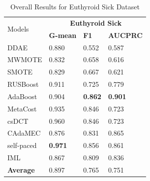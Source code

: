 \begin{table}[h]
    \centering
    \begin{tabular}{|p{}<{\centering}|p{}<{\centering}|p{}<{\centering}|p{}<{\centering}|}
    \hline
    \multirow{2}{*}{Models} & \multicolumn{3}{c|}{\textbf{Euthyroid Sick}}    \\ \cline{2-4} 
                             & \textbf{G-mean} & \textbf{F1} & \textbf{AUCPRC} \\ \hline
    DDAE                     & 0.880	&0.552	&0.587                \\ \hline
    MWMOTE                   & 0.832	&0.658	&0.616                 \\ \hline
    SMOTE                    & 0.829	&0.667	&0.621                 \\ \hline
    RUSBoost                 & 0.911	&0.725	&0.779                 \\ \hline
    AdaBoost                 & 0.904	&\textbf{0.862}	&\textbf{0.901}                 \\ \hline
    MetaCost                 & 0.935	&0.846	&0.723               \\ \hline
    csDCT                    & 0.960	&0.846	&0.723                 \\ \hline
    CAdaMEC                  & 0.876	&0.831	&0.865                 \\ \hline
    self-paced               & \textbf{0.971}	&0.856	&0.861                 \\ \hline
    IML                      & 0.867	&0.809	&0.836                \\ \hline\hline
    \textbf{Average}         & 0.897	&0.765	&0.751                 \\ \hline
    \end{tabular}
    \caption{Overall Results for Euthyroid Sick Dataset}
    \label{tab8}
\end{table}
